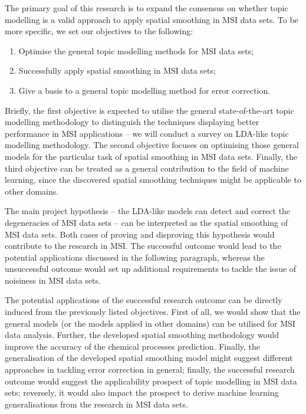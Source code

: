 \documentclass{mprop}
\begin{document}
\par The primary goal of this research is to expand the consensus on whether topic modelling is a valid approach to apply spatial smoothing in MSI data sets. To be more specific, we set our objectives to the following:
\begin{enumerate}
    \item Optimise the general topic modelling methods for MSI data sets;
    \item Successfully apply spatial smoothing in MSI data sets;
    \item Give a basis to a general topic modelling method for error correction.
\end{enumerate}
Briefly, the first objective is expected to utilise the general state-of-the-art topic modelling methodology to distinguish the techniques displaying better performance in MSI applications -- we will conduct a survey on LDA-like topic modelling methodology. The second objective focuses on optimising those general models for the particular task of spatial smoothing in MSI data sets. Finally, the third objective can be treated as a general contribution to the field of machine learning, since the discovered spatial smoothing techniques might be applicable to other domains. 

\par The main project hypothesis -- the LDA-like models can detect and correct the degeneracies of MSI data sets -- can be interpreted as the spatial smoothing of MSI data sets. Both cases of proving and disproving this hypothesis would contribute to the research in MSI. The successful outcome would lead to the potential applications discussed in the following paragraph, whereas the unsuccessful outcome would set up additional requirements to tackle the issue of noisiness in MSI data sets.

\par The potential applications of the successful research outcome can be directly induced from the previously listed objectives. First of all, we would show that the general models (or the models applied in other domains) can be utilised for MSI data analysis. Further, the developed spatial smoothing methodology would improve the accuracy of the chemical processes prediction. Finally, the generalisation of the developed spatial smoothing model might suggest different approaches in tackling error correction in general; finally, the successful research outcome would suggest the applicability prospect of topic modelling in MSI data sets; reversely, it would also impact the prospect to derive machine learning generalisations from the research in MSI data sets.  
\end{document}
